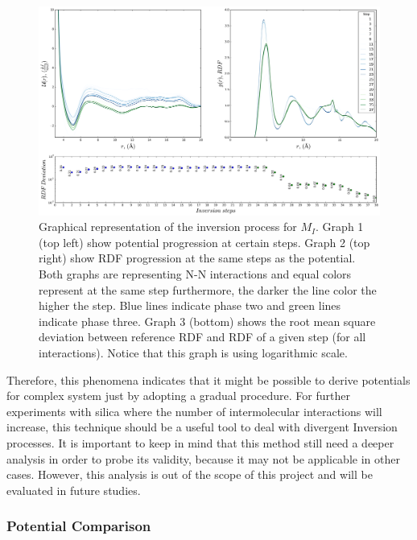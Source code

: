 \documentclass[10pt,a4paper,twoside]{article}
\begin{document}
\begin{figure}[H]
  \begin{center}
	\includegraphics[width=1 \textwidth]{./graphs/ConvHigh}
	\caption{Graphical representation of the inversion process for $M_I$. Graph 1 (top left) show potential progression at certain steps. Graph 2 (top right) show RDF progression at the same steps as the potential. Both graphs are representing N-N interactions and equal colors represent at the same step furthermore, the darker the line color the higher the step. Blue lines indicate phase two and green lines indicate phase three.  Graph 3 (bottom) shows the root mean square deviation between reference RDF and RDF of a given step (for all interactions). Notice that this graph is using logarithmic scale.}
	\label{Fig:convHigh}
  \end{center}
\end{figure} 

Therefore, this phenomena indicates that it might be possible to derive potentials for complex system just by adopting a gradual procedure. For further experiments with silica where the number of intermolecular interactions will increase, this technique should be a useful tool to deal with divergent Inversion processes. It is important to keep in mind that this method still need a deeper analysis in order to probe its validity, because it may not be applicable in other cases. However, this analysis is out of the scope of this project and will be evaluated in future studies.

\subsubsection{Potential Comparison}
\end{document}
